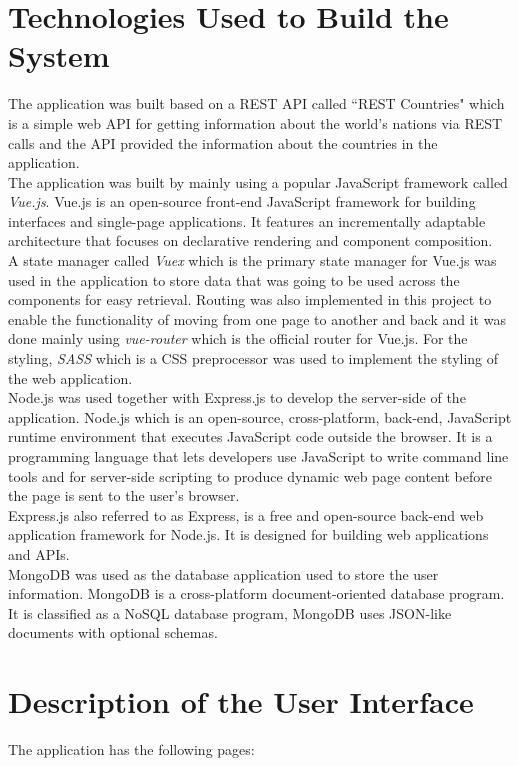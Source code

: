\documentclass[twoside, a4paper, 12pt]{report}
\begin{document}
\section{Technologies Used to Build the System}
The application was built based on a REST API called ``REST Countries" which is a simple web API for getting information about the world's nations via REST calls and the API provided the information about the countries in the application.\\ 
\indent
The application was built by mainly using a popular JavaScript framework called \emph{Vue.js}. Vue.js is an open-source front-end JavaScript framework for building interfaces and single-page applications. It features an incrementally adaptable architecture that focuses on declarative rendering and component composition.\\ 
\indent
A state manager called \emph{Vuex} which is the primary state manager for Vue.js was used in the application to store data that was going to be used across the components for easy retrieval. Routing was also implemented in this project to enable the functionality of moving from one page to another and back and it was done mainly using \emph{vue-router} which is the official router for Vue.js. For the styling, \emph{SASS} which is a CSS preprocessor was used to implement the styling of the web application.\\
\indent
Node.js was used together with Express.js to develop the server-side of the application. Node.js which is an open-source, cross-platform, back-end, JavaScript runtime environment that executes JavaScript code outside the browser. It is a programming language that lets developers use JavaScript to write command line tools and for server-side scripting to produce dynamic web page content before the page is sent to the user's browser.\\
\indent
Express.js also referred to as Express, is a free and open-source back-end web application framework for Node.js. It is designed for building web applications and APIs.\\
\indent
MongoDB was used as the database application used to store the user information. MongoDB is a cross-platform document-oriented database program. It is classified as a NoSQL database program, MongoDB uses JSON-like documents with optional schemas.

\section{Description of the User Interface}
The application has the following pages:
\end{document}
